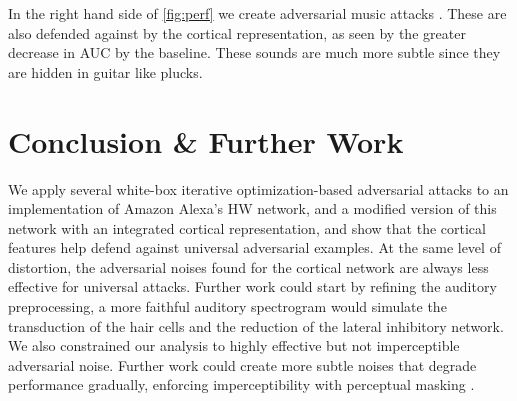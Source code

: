 \documentclass{article}
\begin{document}
In the right hand side of \cref{fig:perf} we create adversarial music attacks \cite{adv_music}. These are also defended against by the cortical representation, as seen by the greater decrease in AUC by the baseline. These sounds are much more subtle since they are hidden in guitar like plucks.


\section{Conclusion \& Further Work}

We apply several white-box iterative optimization-based adversarial attacks to an implementation of Amazon Alexa's HW network, and a modified version of this network with an integrated cortical representation, and show that the cortical features help defend against universal adversarial examples.
At the same level of distortion, the adversarial noises found for the cortical network are always less effective for universal attacks.
Further work could start by refining the auditory preprocessing, a more faithful auditory spectrogram would simulate the transduction of the hair cells and the reduction of the lateral inhibitory network.
We also constrained our analysis to highly effective but not imperceptible adversarial noise. Further work could create more subtle noises that degrade performance gradually, enforcing imperceptibility with perceptual masking \cite{qin_2019}.


\begin{comment}
\begin{figure}[htb]


\begin{minipage}[b]{.48\linewidth}
\centering
\centerline{\texttt{[image: figures/nirvana\_cm]}}
\centerline{(b) Results 3}\medskip
\end{minipage}
\hfill
\begin{minipage}[b]{0.48\linewidth}
\centering
\centerline{\texttt{[image: figures/nirvana\_FA\_MR]}}
\centerline{(c) Result 4}\medskip
\end{minipage}
%
\caption{Example of placing a figure with experimental results.}
\label{fig:res}
%
\end{figure}
\end{comment}
\end{document}
